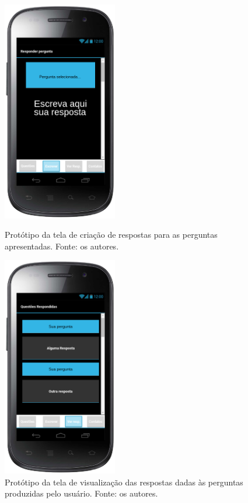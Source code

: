 \begin{figure}
\centering
\begin{minipage}{0.45\textwidth}
\centering
\includegraphics[width=5cm]{protescreverresposta.png}
\caption{Protótipo da tela de criação de respostas para as perguntas apresentadas. Fonte: os autores.}
\label{fig:prot_escreverResposta}
\end{minipage}\hfill
\begin{minipage}{0.45\textwidth}
\centering
\includegraphics[width=5cm]{protrespostas.png}
\caption{Protótipo da tela de visualização das respostas dadas às perguntas produzidas pelo usuário. Fonte: os autores.}
\label{fig:prot_respostas}
\end{minipage}
\end{figure}

